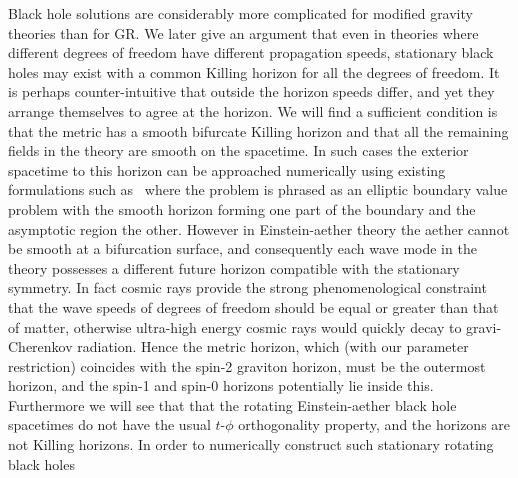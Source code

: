 \documentclass[12pt]{article}
\numberwithin{equation}{section}
\begin{document}
Black hole solutions are considerably more complicated for modified gravity theories than for GR.
%
We later give an argument that even in theories where different degrees of freedom have different propagation speeds, stationary black holes may exist with a common Killing horizon for all the degrees of freedom. 
It is perhaps counter-intuitive that outside the horizon speeds differ, and yet they arrange themselves to agree at the horizon. 
We will find a sufficient condition is that the metric has a smooth bifurcate Killing horizon and that all the remaining fields in the theory are smooth on the spacetime. 
In such cases the exterior spacetime to this horizon can be approached numerically using existing formulations such as~\cite{Kleihaus:2000kg, Headrick:2009pv} where the problem is phrased as an elliptic boundary value problem
 with the smooth horizon forming one part of the boundary and the asymptotic region the other. 
However in Einstein-aether theory the aether cannot be smooth at a bifurcation surface, and consequently each wave mode in the theory possesses a different future horizon compatible with the stationary symmetry. 
%
In fact cosmic rays provide the strong phenomenological constraint that the wave speeds of degrees of freedom should be equal or greater than that of matter, otherwise ultra-high energy cosmic rays would quickly decay to gravi-Cherenkov radiation. Hence the metric horizon, which (with our parameter restriction) coincides with the spin-2 graviton horizon, must be the outermost horizon, and the spin-1 and spin-0 horizons potentially lie inside this. 
Furthermore we will see that that the rotating Einstein-aether black hole spacetimes do not have the usual $t$-$\phi$ orthogonality property, and the horizons are not Killing horizons.
In order to numerically construct such stationary rotating black holes 
\end{document}
